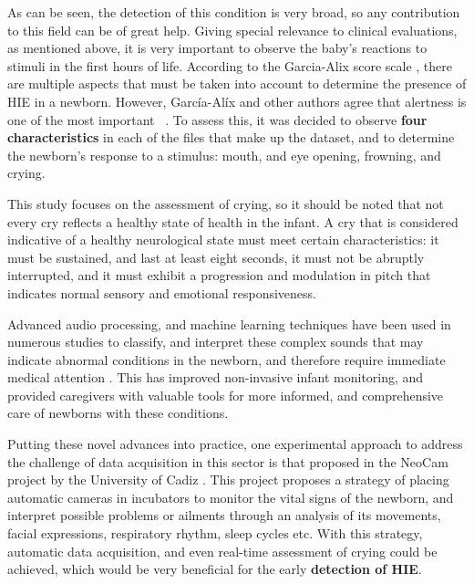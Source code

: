 As can be seen, the detection of this condition is very broad, so any contribution to this field can be of great help. Giving special relevance to clinical evaluations, as mentioned above, it is very important to observe the baby's reactions to stimuli in the first hours of life. According to the Garcia-Alix score scale \cite{garcia_alix_scale}, there are multiple aspects that must be taken into account to determine the presence of HIE in a newborn. However, García-Alíx and other authors agree that alertness is one of the most important ~\cite{kurinczuk_review,sarnat_scale}. To assess this, it was decided to observe \textbf{four characteristics} in each of the files that make up the dataset, and to determine the newborn's response to a stimulus: mouth, and eye opening, frowning, and crying.

This study focuses on the assessment of crying, so it should be noted that not every cry reflects a healthy state of health in the infant. A cry that is considered indicative of a healthy neurological state must meet certain characteristics: it must be sustained, and last at least eight seconds, it must not be abruptly interrupted, and it must exhibit a progression and modulation in pitch that indicates normal sensory and emotional responsiveness.

Advanced audio processing, and machine learning techniques have been used in numerous studies to classify, and interpret these complex sounds that may indicate abnormal conditions in the newborn, and therefore require immediate medical attention \cite{hammoud_machine_2024, tuduce_why_2018}. This has improved non-invasive infant monitoring, and provided caregivers with valuable tools for more informed, and comprehensive care of newborns with these conditions. 

Putting these novel advances into practice, one experimental approach to address the challenge of data acquisition in this sector is that proposed in the NeoCam project by the University of Cadiz \cite{ruiz_zafra_neocam_2023}. This project proposes a strategy of placing automatic cameras in incubators to monitor the vital signs of the newborn, and interpret possible problems or ailments through an analysis of its movements, facial expressions, respiratory rhythm, sleep cycles etc. With this strategy, automatic data acquisition, and even real-time assessment of crying could be achieved, which would be very beneficial for the early \textbf{detection of HIE}. 


